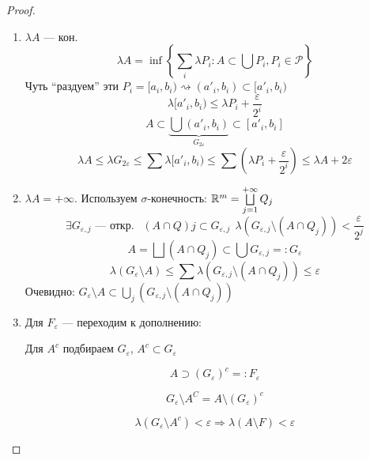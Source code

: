 \begin{enumerate}
          \begin{proof}\itemfix
              \begin{enumerate}
                  \item \(\lambda A\) --- кон.
                        \[\lambda A = \inf \left\{\sum_i \lambda P_i : A\subset \bigcup P_i, P_i \in \mathcal{P}\right\} \]
                        Чуть ``раздуем'' эти \(P_i = [a_i, b_i) \rightsquigarrow (a'_i, b_i) \subset [a'_i, b_i)\)
                        \[\lambda[a'_i, b_i) \leq \lambda P_i + \frac{\varepsilon}{2^i}\]
                        \[A\subset \underbrace{\bigcup(a'_i, b_i)}_{G_{2\varepsilon}} \subset [a'_i, b_i]\]
                        \[\lambda A \leq \lambda G_{2\varepsilon} \leq \sum \lambda [a'_i, b_i) \leq \sum \left( \lambda P_i + \frac{\varepsilon}{2^i} \right) \leq \lambda A + 2 \varepsilon\]
                  \item \(\lambda A = +\infty\). Используем \(\sigma\)-конечность: \(\mathbb{R}^m =\bigsqcup\limits_{j = 1}^{ +\infty} Q_j\)
                        \[\exists G_{\varepsilon, j} \text{ --- откр. } \ \ (A\cap Q)j\subset G_{\varepsilon, j} \ \ \lambda(G_{\varepsilon, j} \setminus (A\cap Q_j)) < \frac{\varepsilon}{2^j} \]
                        \[A = \bigsqcup (A\cap Q_j) \subset \bigcup G_{\varepsilon, j} = : G_\varepsilon\]
                        \[\lambda(G_\varepsilon \setminus A) \leq \sum \lambda(G_{\varepsilon, j} \setminus (A\cap Q_j)) \leq \varepsilon\]
                        Очевидно: \(G_\varepsilon \setminus A \subset \bigcup\limits_j (G_{\varepsilon, j} \setminus (A\cap Q_j))\)
                \item Для \(F_\varepsilon\) --- переходим к дополнению:
                
                    Для \(A^c\) подбираем \(G_\varepsilon\), \(A^c\subset G_\varepsilon\)

                    \[A\supset (G_\varepsilon)^c = : F_\varepsilon\]

                    \[G_\varepsilon \setminus  A^C = A\setminus (G_\varepsilon)^c\]
                    
                    \[\lambda(G_\varepsilon\setminus A^c) < \varepsilon \Rightarrow \lambda(A\setminus F) < \varepsilon\]
              \end{enumerate}
          \end{proof}
\end{enumerate}

